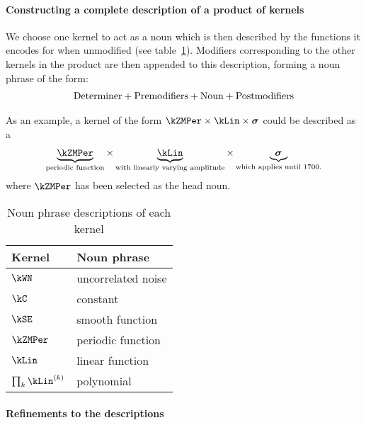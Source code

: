 \paragraph{Constructing a complete description of a product of kernels}
We choose one kernel to act as a noun which is then described by the functions it encodes for when unmodified (see table~\ref{table:nouns}).
Modifiers corresponding to the other kernels in the product are then appended to this description, forming a noun phrase of the form:
\begin{align*}
\textnormal{Determiner}	+	\textnormal{Premodifiers} +	\textnormal{Noun}	+	\textnormal{Postmodifiers}
\end{align*}

As an example, a kernel of the form $\kZMPer \times  \kLin \times \boldsymbol{\sigma}$ could be described as a
\begin{align*}
\underbrace{\kZMPer}_{\textnormal{\scriptsize periodic function}} \times 
\underbrace{\kLin}_{\textnormal{\scriptsize with linearly varying amplitude}} \times 
\underbrace{\boldsymbol{\sigma}}_{\textnormal{\scriptsize which applies until 1700.}}
\end{align*}
where $\kZMPer$ has been selected as the head noun.

\begin{table}[ht]
\centering
\begin{tabular}{l|l}
Kernel & Noun phrase \\
\midrule
$\kWN$  & uncorrelated noise \\
$\kC$   & constant \\
$\kSE$  & smooth function \\
$\kZMPer$ & periodic function \\
$\kLin$ & linear function \\
$\prod_k \kLin^{(k)}$ & polynomial \\
\end{tabular}
\caption[Noun phrase descriptions of each kernel]{
Noun phrase descriptions of each kernel
}
\label{table:nouns}
\end{table}

\paragraph{Refinements to the descriptions}

